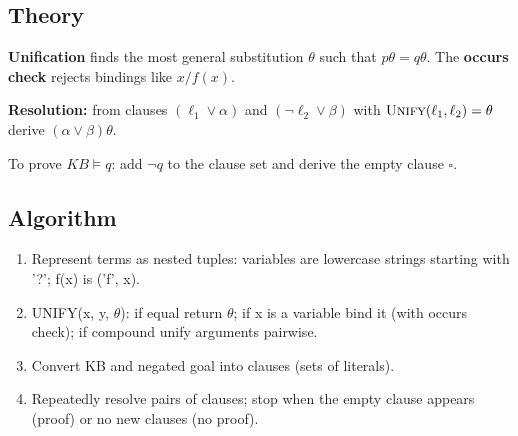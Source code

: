 \documentclass[11pt]{article}
\begin{document}
\subsection*{Theory}
\textbf{Unification} finds the most general substitution $\theta$ such that $p\theta=q\theta$. The \textbf{occurs check} rejects bindings like $x/f(x)$.

\textbf{Resolution:} from clauses $(\ell_1\vee\alpha)$ and $(\neg\ell_2\vee\beta)$ with $\textsc{Unify}(\ell_1,\ell_2)=\theta$ derive $(\alpha\vee\beta)\theta$.

To prove $KB\models q$: add $\neg q$ to the clause set and derive the empty clause $\square$.
\subsection*{Algorithm}
\begin{algo}[Procedure]\begin{enumerate}
\item Represent terms as nested tuples: variables are lowercase strings starting with '?'; f(x) is ('f', x).
\item UNIFY(x, y, $\theta$): if equal return $\theta$; if x is a variable bind it (with occurs check); if compound unify arguments pairwise.
\item Convert KB and negated goal into clauses (sets of literals).
\item Repeatedly resolve pairs of clauses; stop when the empty clause appears (proof) or no new clauses (no proof).
\end{enumerate}\end{algo}
\end{document}
